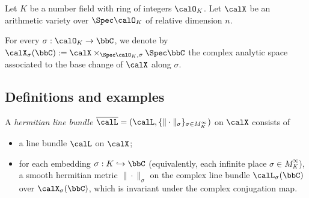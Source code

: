 
Let \(K\) be a number field with ring of integers \(\calO_K\).
Let \(\calX\) be an arithmetic variety over \(\Spec \calO_K\) of relative dimension \(n\).

For every \(\sigma: \calO_K \to \bbC\), we denote by \(\calX_\sigma(\bbC) := \calX \times_{\Spec \calO_K, \sigma} \Spec \bbC\)
the complex analytic space associated to the base change of \(\calX\) along \(\sigma\).

\subsection{Definitions and examples}

    \begin{definition}\label{def:hermitian_line_bundles}
        A \emph{hermitian line bundle} \(\overline{\calL} = (\calL, \{\|\cdot\|_\sigma\}_{\sigma \in M_K^\infty})\) on \(\calX\) consists of
        \begin{itemize}
            \item a line bundle \(\calL\) on \(\calX\);
            \item for each embedding \(\sigma: K \hookrightarrow \bbC\) (equivalently, each infinite place \(\sigma \in M_K^\infty\)), 
                a smooth hermitian metric \(\|\cdot\|_\sigma\) on the complex line bundle \(\calL_\sigma(\bbC)\) over \(\calX_\sigma(\bbC)\), 
                which is invariant under the complex conjugation map.
        \end{itemize}
    \end{definition}

